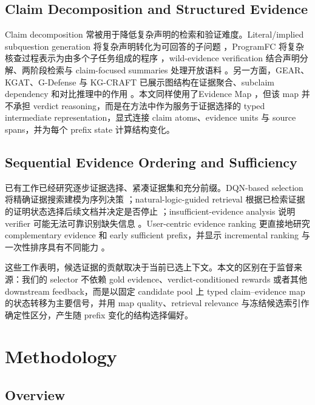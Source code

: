 \documentclass[letterpaper]{article}
\begin{document}
\subsection{Claim Decomposition and Structured Evidence}

Claim decomposition 常被用于降低复杂声明的检索和验证难度。Literal/implied subquestion generation 将复杂声明转化为可回答的子问题 \citep{Chen2022ClaimDecomp}，ProgramFC 将复杂核查过程表示为由多个子任务组成的程序 \citep{Pan2023ProgramFC}，wild-evidence verification 结合声明分解、两阶段检索与 claim-focused summaries 处理开放语料 \citep{Chen2023WildEvidence}。另一方面，GEAR、KGAT、G-Defense 与 KG-CRAFT 已展示图结构在证据聚合、subclaim dependency 和对比推理中的作用 \citep{Zhou2019GEAR,Liu2019KGAT,Wang2026GDefense,Lourenco2026KGCRAFT}。本文同样使用了Evidence Map ，但该 map 并不承担 verdict reasoning，而是在方法中作为服务于证据选择的 typed intermediate representation，显式连接 claim atoms、evidence units 与 source spans，并为每个 prefix state 计算结构变化。

\subsection{Sequential Evidence Ordering and Sufficiency}

已有工作已经研究逐步证据选择、紧凑证据集和充分前缀。DQN-based selection 将精确证据搜索建模为序列决策 \citep{Wan2021DQN}；natural-logic-guided retrieval 根据已检索证据的证明状态选择后续文档并决定是否停止 \citep{Aly2022NaturalLogic}；insufficient-evidence analysis 说明 verifier 可能无法可靠识别缺失信息 \citep{Atanasova2022Insufficient}。User-centric evidence ranking 更直接地研究 complementary evidence 和 early sufficient prefix，并显示 incremental ranking 与一次性排序具有不同能力 \citep{Alt2026EvidenceRanking}。

这些工作表明，候选证据的贡献取决于当前已选上下文。本文的区别在于监督来源：我们的 selector 不依赖 gold evidence、verdict-conditioned rewards 或者其他 downstream feedback，而是以固定 candidate pool 上 typed claim--evidence map 的状态转移为主要信号，并用 map quality、retrieval relevance 与冻结候选索引作确定性区分，产生随 prefix 变化的结构选择偏好。

\section{Methodology}

\subsection{Overview}
\end{document}
